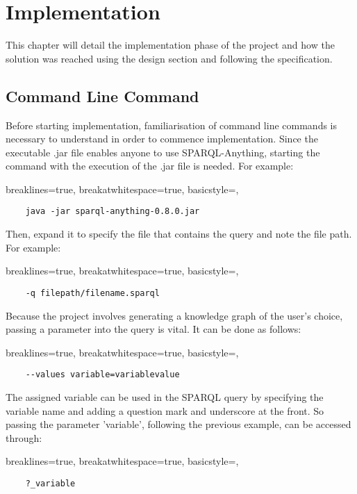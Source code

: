 \chapter{Implementation}
This chapter will detail the implementation phase of the project and how the solution was reached using the design section and following the specification. 

\section{Command Line Command}
\hspace*{0.5cm} Before starting implementation, familiarisation of command line commands is necessary to understand in order to commence implementation. Since the executable .jar file enables anyone to use SPARQL-Anything, starting the command with the execution of the .jar file is needed. For example:

\lstset
{
    breaklines=true,
    breakatwhitespace=true,
    basicstyle=\ttfamily,
}
\begin{lstlisting}
    java -jar sparql-anything-0.8.0.jar 
\end{lstlisting}

\noindent Then, expand it to specify the file that contains the query and note the file path. For example:

\lstset
{
    breaklines=true,
    breakatwhitespace=true,
    basicstyle=\ttfamily,
}
\begin{lstlisting}
    -q filepath/filename.sparql
\end{lstlisting}

\noindent Because the project involves generating a knowledge graph of the user's choice, passing a parameter into the query is vital. It can be done as follows: 

\lstset
{
    breaklines=true,
    breakatwhitespace=true,
    basicstyle=\ttfamily,
}
\begin{lstlisting}
    --values variable=variablevalue
\end{lstlisting}

\noindent The assigned variable can be used in the SPARQL query by specifying the variable name and adding a question mark and underscore at the front. So passing the parameter 'variable', following the previous example, can be accessed through:

\lstset
{
    breaklines=true,
    breakatwhitespace=true,
    basicstyle=\ttfamily,
}
\begin{lstlisting}
    ?_variable
\end{lstlisting}

